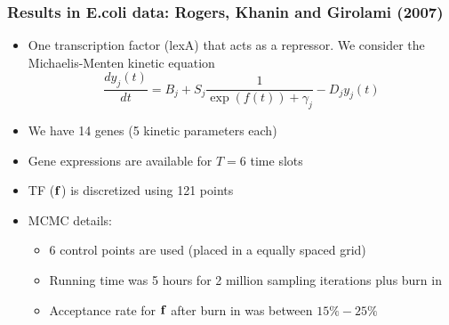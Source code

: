 \documentclass{beamer}
\begin{document}
%
%
%
%    
%
%
%
%
% 
%
%
%
%





\frame
{
 

\frametitle{Results in E.coli data: Rogers, Khanin and Girolami (2007)}

\begin{itemize}
\item  One transcription factor (lexA) that acts as a repressor. We
  consider the Michaelis-Menten kinetic equation  
$$
\frac{d y_j (t)} {d t} =
B_j + S_j \frac{1}{\exp(f(t)) + \gamma_j} - D_j y_j(t)
$$

\item We have 14 genes (5 kinetic parameters each)

\item Gene expressions are available for $T=6$ time slots 

\item TF ($\mathbf{f}$) is discretized using 121 points

\item MCMC details: 
\begin{itemize}
\item 6 control points are used (placed in a equally spaced grid)    
\item Running time was  5 hours for 2 million sampling iterations plus
      burn in 
\item Acceptance rate for $\mathbf{f}$ after burn in was between 
      $15\%-25\%$ 
\end{itemize}

\end{itemize}

}
\end{document}
